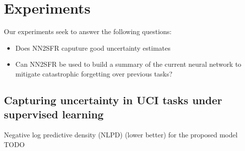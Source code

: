 \documentclass{article}
\newlength{\tblw}
\newcommand{\state}{\ensuremath{\mathbf{s}}}
\newcommand{\action}{\ensuremath{\mathbf{a}}}
\newcommand{\inducingVariable}{\ensuremath{\mathbf{u}}}
\newcommand{\dualParam}[1]{\ensuremath{\bm{\lambda}_{#1}}}
\newcommand{\meanParam}[1]{\ensuremath{\bm{\mu}_{#1}}}
\newcommand{\horizon}{\ensuremath{h}}
\newcommand{\latentFn}{\ensuremath{f}}
\begin{document}
%
%
%



\section{Experiments}
\label{sec:experiments}


Our experiments seek to answer the following questions:
\begin{itemize}
  \item Does NN2SFR caputure good uncertainty estimates
  \item Can NN2SFR be used to build a summary of the current neural network to mitigate catastrophic forgetting over previous tasks?
\end{itemize}

\subsection{Capturing uncertainty in UCI tasks under supervised learning}
%


\begin{table}[t!] 
  \centering\scriptsize
  \caption{Negative log predictive density (NLPD) (lower better) for the proposed model TODO} 
	\label{tbl:uci}
	\renewcommand{\arraystretch}{1.}
	\setlength{\tabcolsep}{2pt}
	\setlength{\tblw}{0.14\textwidth}  
	
	\newcommand{\val}[2]{%
		$#1$\textcolor{gray}{\tiny ${\pm}#2$}
	} 

	
\end{table}
\end{document}
